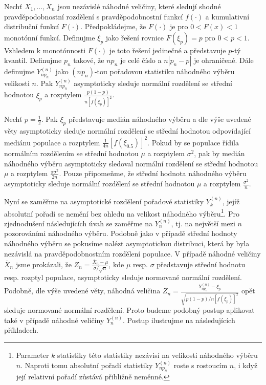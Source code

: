 \begin{theorem}
Nechť $X_1, ..., X_n$ jsou nezávislé náhodné veličiny, které sledují shodné pravděpodobnostní rozdělení s pravděpodobnostní funkcí $f(\cdot)$ a kumulativní distribuční funkcí $F(\cdot)$. Předpokládejme, že $F(\cdot)$ je pro $0 < F(x) < 1$ monotónní funkcí. Definujme $\xi_p$ jako řešení rovnice $F(\xi_p) = p$ pro $0 < p < 1$. Vzhledem k monotónnosti $F(\cdot)$ je toto řešení jedinečné a představuje $p$-tý kvantil. Definujme $p_n$ takové, že $n p_n$ je celé číslo a $n|p_n - p|$ je ohraničené. Dále definujme $Y_{n p_n}^{(n)}$ jako $(n p_n)$-tou pořadovou statistiku náhodného výběru velikosti $n$. Pak $Y_{n p_n}^{(n)}$ asymptoticky sleduje normální rozdělení se střední hodnotou $\xi_p$ a rozptylem $\frac{p(1 - p)}{n[f(\xi_p)]^2}$.
\end{theorem}

\begin{example}
Nechť $p = \frac{1}{2}$. Pak $\xi_p$ představuje medián náhodného výběru a dle výše uvedené věty asymptoticky sleduje normální rozdělení se střední hodnotou odpovídající mediánu populace a rozptylem $\frac{1}{4n}[f(\xi_{0.5})]^2$. Pokud by se populace řídila normálním rozdělením se střední hodnotou $\mu$ a rozptylem $\sigma^2$, pak by medián náhodného výběru asymptoticky sledoval normální rozdělení se střední hodnotou $\mu$ a rozptylem $\frac{\pi \sigma^2}{2n}$. Pouze připomeňme, že střední hodnota náhodného výběru asymptoticky sleduje normální rozdělení se střední hodnotou $\mu$ a rozptylem $\frac{\sigma^2}{n}$.
\end{example}

Nyní se zaměřme na asymptotické rozdělení pořadové statistiky $Y_k^{(n)}$, jejíž absolutní pořadí se nemění bez ohledu na velikost náhodného výběru\footnote{Parameter $k$ statistiky této statistiky nezávisí na velikosti náhodného výběru $n$. Naproti tomu absolutní pořadí statistiky $Y_{n p_n}^{(n)}$ roste s rostoucím $n$, i když její relativní pořadí zůstává přibližně neměnné.}. Pro zjednodušení následujících úvah se zaměřme na $Y_n^{(n)}$, tj. na největší mezi $n$ pozorováními náhodného výběru. Podobně jako v případě střední hodnoty náhodného výběru se pokusíme nalézt asymptotickou distribuci, která by byla nezávislá na pravděpodobnostním rozdělení populace. V případě náhodné veličiny $\overline{X}_n$ jsme prokázali, že $Z_n = \frac{\overline{X}_n - \mu}{\sigma / \sqrt{n}}$, kde $\mu$ resp. $\sigma$ představuje střední hodnotu resp. rozptyl populace, asymptoticky sleduje normované normální rozdělení. Podobně, dle výše uvedené věty, náhodná veličina $Z_n = \frac{Y_{n p_n}^{(n)} - \xi_p}{\sqrt{p(1 - p)/n[f(\xi_p)]^2}}$ opět sleduje normované normální rozdělení. Proto budeme podobný postup aplikovat také v případě náhodné veličiny $Y_n^{(n)}$. Postup ilustrujme na následujících příkladech.

